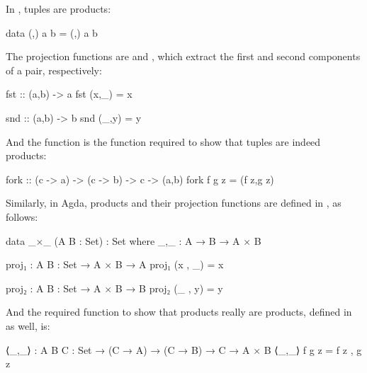 \begin{example}
  \label{ex:product-haskell}

  \index{\hask}


  In \hask, tuples are products:
  \begin{codehaskell}
data (,) a b = (,) a b
  \end{codehaskell}
  The projection functions are  and
  , which extract the first and second components of
  a pair, respectively:
  \begin{codehaskell}
fst :: (a,b) -> a
fst (x,_) = x

snd :: (a,b) -> b
snd (_,y) = y
  \end{codehaskell}
  And the  function is the function required to show
  that tuples are indeed products:
  \begin{codehaskell}
fork :: (c -> a) -> (c -> b) -> c -> (a,b)
fork f g z = (f z,g z)
  \end{codehaskell}

\end{example}

\begin{example}
  \label{ex:product-agda}


  Similarly, in Agda, products and their projection functions are
  defined in , as follows:
  \begin{codeagda}
data _×_ (A B : Set) : Set where
  _,_ : A → B → A × B

proj₁ : {A B : Set} → A × B → A
proj₁ (x , _) = x

proj₂ : {A B : Set} → A × B → B
proj₂ (_ , y) = y
  \end{codeagda}
  And the required function to show that products really are products,
  defined in  as well, is:
  \begin{codeagda}
⟨_,_⟩ : {A B C : Set} → (C → A) → (C → B) → C → A × B
⟨_,_⟩ f g z = f z , g z
  \end{codeagda}

\end{example}


